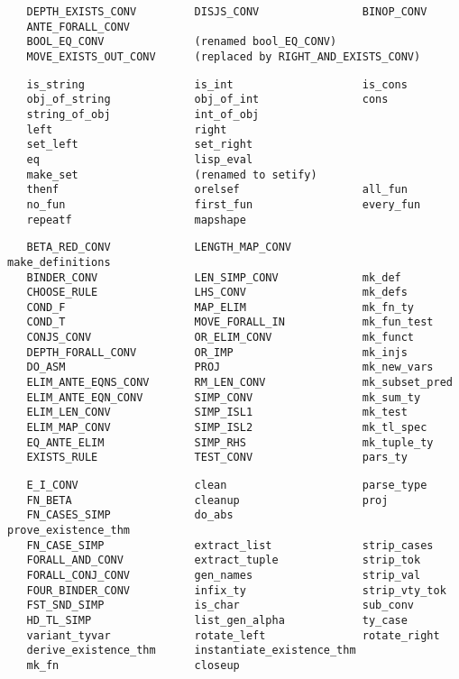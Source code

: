 \begin{hol}\begin{verbatim}
   DEPTH_EXISTS_CONV         DISJS_CONV                BINOP_CONV
   ANTE_FORALL_CONV
   BOOL_EQ_CONV              (renamed bool_EQ_CONV)
   MOVE_EXISTS_OUT_CONV      (replaced by RIGHT_AND_EXISTS_CONV)
\end{verbatim}\end{hol}
\begin{hol}\begin{verbatim}
   is_string                 is_int                    is_cons
   obj_of_string             obj_of_int                cons
   string_of_obj             int_of_obj
   left                      right
   set_left                  set_right
   eq                        lisp_eval
   make_set                  (renamed to setify)
   thenf                     orelsef                   all_fun
   no_fun                    first_fun                 every_fun
   repeatf                   mapshape
 \end{verbatim}\end{hol}
\begin{hol}\begin{verbatim}
   BETA_RED_CONV             LENGTH_MAP_CONV           make_definitions
   BINDER_CONV               LEN_SIMP_CONV             mk_def
   CHOOSE_RULE               LHS_CONV                  mk_defs
   COND_F                    MAP_ELIM                  mk_fn_ty
   COND_T                    MOVE_FORALL_IN            mk_fun_test
   CONJS_CONV                OR_ELIM_CONV              mk_funct
   DEPTH_FORALL_CONV         OR_IMP                    mk_injs
   DO_ASM                    PROJ                      mk_new_vars
   ELIM_ANTE_EQNS_CONV       RM_LEN_CONV               mk_subset_pred
   ELIM_ANTE_EQN_CONV        SIMP_CONV                 mk_sum_ty
   ELIM_LEN_CONV             SIMP_ISL1                 mk_test
   ELIM_MAP_CONV             SIMP_ISL2                 mk_tl_spec
   EQ_ANTE_ELIM              SIMP_RHS                  mk_tuple_ty
   EXISTS_RULE               TEST_CONV                 pars_ty
\end{verbatim}\end{hol}
\begin{hol}\begin{verbatim}
   E_I_CONV                  clean                     parse_type
   FN_BETA                   cleanup                   proj
   FN_CASES_SIMP             do_abs                    prove_existence_thm
   FN_CASE_SIMP              extract_list              strip_cases
   FORALL_AND_CONV           extract_tuple             strip_tok
   FORALL_CONJ_CONV          gen_names                 strip_val
   FOUR_BINDER_CONV          infix_ty                  strip_vty_tok
   FST_SND_SIMP              is_char                   sub_conv
   HD_TL_SIMP                list_gen_alpha            ty_case
   variant_tyvar             rotate_left               rotate_right
   derive_existence_thm      instantiate_existence_thm
   mk_fn                     closeup
\end{verbatim}\end{hol}
